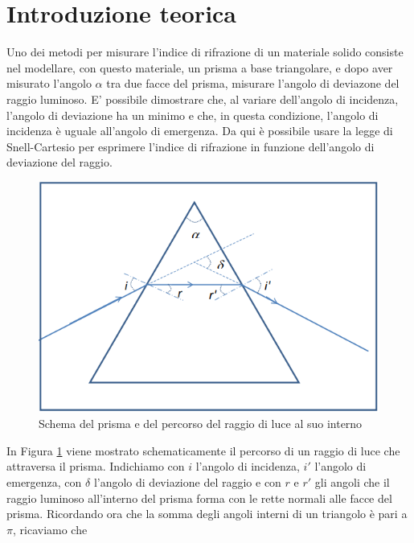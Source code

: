 \documentclass{article}
\begin{document}
\clearpage

\section{Introduzione teorica}
Uno dei metodi per misurare l'indice di rifrazione di un materiale solido consiste nel modellare, con questo materiale, un prisma a base triangolare, e dopo aver misurato l'angolo $\alpha$ tra due facce del prisma, misurare l'angolo di deviazone del raggio luminoso. E' possibile dimostrare che, al variare dell'angolo di incidenza, l'angolo di deviazione ha un minimo e che, in questa condizione, l'angolo di incidenza è uguale all'angolo di emergenza. Da qui è possibile usare la legge di Snell-Cartesio per esprimere l'indice di rifrazione in funzione dell'angolo di deviazione del raggio.

\vspace{3mm}

\begin{figure}[h]
  \centering
  \includegraphics[scale=0.7]{Schema_Prisma_1}
  \caption{Schema del prisma e del percorso del raggio di luce al suo interno}
  \label{Schema_Prisma_1}
\end{figure}

In Figura \ref{Schema_Prisma_1} viene mostrato schematicamente il percorso di un raggio di luce che attraversa il prisma. Indichiamo con $i$ l'angolo di incidenza, $i'$ l'angolo di emergenza, con $\delta$ l'angolo di deviazione del raggio e con $r$ e $r'$ gli angoli che il raggio luminoso all'interno del prisma forma con le rette normali alle facce del prisma. Ricordando ora che la somma degli angoli interni di un triangolo è pari a $\pi$, ricaviamo che
\end{document}

